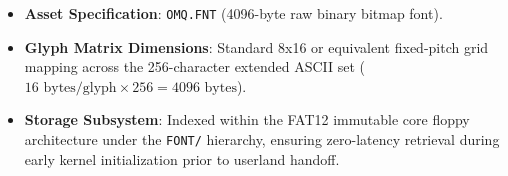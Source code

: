 \documentclass[11pt,a4paper]{article}
\begin{document}
\begin{itemize}
    \item \textbf{Asset Specification}: \texttt{OMQ.FNT} (4096-byte raw binary bitmap font).
    \item \textbf{Glyph Matrix Dimensions}: Standard 8x16 or equivalent fixed-pitch grid mapping across the 256-character extended ASCII set ($16 \text{ bytes/glyph} \times 256 = 4096 \text{ bytes}$).
    \item \textbf{Storage Subsystem}: Indexed within the FAT12 immutable core floppy architecture under the \texttt{FONT/} hierarchy, ensuring zero-latency retrieval during early kernel initialization prior to userland handoff.
\end{itemize}
\end{document}
